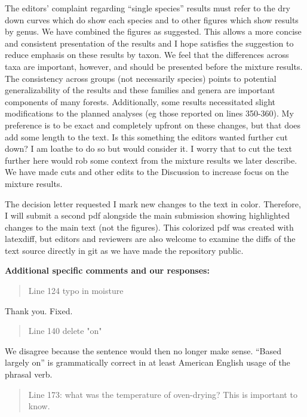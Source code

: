 \documentclass[letterpaper, 12pt]{letter}
\begin{document}
\begin{letter}{}
The editors' complaint regarding ``single species'' results must refer to the
dry down curves which do show each species and to other figures which show
results by genus. We have combined the figures as suggested. This allows a more
concise and consistent presentation of the results and I hope satisfies the
suggestion to reduce emphasis on these results by taxon. We feel that the
differences across taxa are important, however, and should be presented before
the mixture results. The consistency across groups (not necessarily species)
points to potential generalizability of the results and these families and
genera are important components of many forests. Additionally, some results
necessitated slight modifications to the planned analyses (eg those reported on
lines 350-360). My preference is to be exact and completely upfront on these
changes, but that does add some length to the text. Is this something the
editors wanted further cut down? I am loathe to do so but would consider it. I
worry that to cut the text further here would rob some context from the mixture
results we later describe. We have made cuts and other edits to the Discussion
to increase focus on the mixture results.

The decision letter requested I mark new changes to the text in color.
Therefore, I will submit a second pdf alongside the main submission showing
highlighted changes to the main text (not the figures). This colorized pdf was
created with latexdiff, but editors and reviewers are also welcome to examine
the diffs of the text source directly in git as we have made the repository
public.


{\bf Additional specific comments and our responses:}

\begin{quote}
  Line 124 typo in moisture
\end{quote}

Thank you. Fixed.

\begin{quote}
  Line 140 delete "on"
\end{quote}

We disagree because the sentence would then no longer make sense. ``Based
largely on'' is grammatically correct in at least American English usage of the
phrasal verb.

\begin{quote}
  Line 173: what was the temperature of oven-drying? This is important to know.
\end{quote}


\end{letter}
\end{document}

